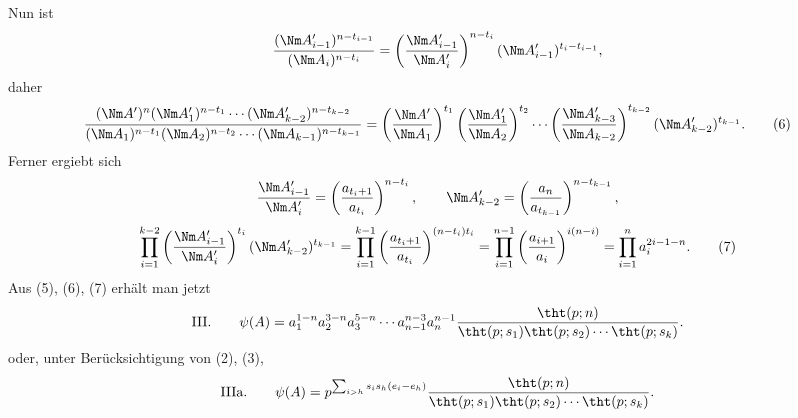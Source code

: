 Nun ist
\[
 { (\Nm A_{i-1}')^{n-t_{i-1}}
 \over (\Nm A_i)^{n-t_i} }
 =\left({\Nm A_{i-1}'\over\Nm A_i'}\right)^{n-t_i}(\Nm A_{i-1}')^{t_i-t_{i-1}},
\]
daher
\begin{equation}
 { (\Nm A')^n(\Nm A_1')^{n-t_1}\cdots(\Nm A_{k-2}')^{n-t_{k-2}}
 \over
 (\Nm A_1)^{n-t_1}(\Nm A_2)^{n-t_2}\cdots(\Nm A_{k-1})^{n-t_{k-1}} }
 =\left({\Nm A'\over\Nm A_1}\right)^{t_1}
 \left({\Nm A_1'\over\Nm A_2}\right)^{t_2}
 \cdots
 \left({\Nm A_{k-3}'\over\Nm A_{k-2}}\right)^{t_{k-2}}
 (\Nm A_{k-2}')^{t_{k-1}}.
\tag{6}
\end{equation}
Ferner ergiebt sich
\[
 {\Nm A_{i-1}'\over\Nm A_i'}=\left({a_{t_i+1}\over a_{t_i}}\right)^{n-t_i},
 \qquad
 \Nm A_{k-2}'=\left({a_n\over a_{t_{k-1}}}\right)^{n-t_{k-1}},
\]
\begin{equation}
 \prod_{i=1}^{k-2}\left({\Nm A_{i-1}'\over\Nm A_i'}\right)^{t_i}
 (\Nm A_{k-2}')^{t_{k-1}}
 =\prod_{i=1}^{k-1}\left({a_{t_i+1}\over a_{t_i}}\right)^{(n-t_i)t_i}
 =\prod_{i=1}^{n-1}\left({a_{i+1}\over a_i}\right)^{i(n-i)}
 =\prod_{i=1}^n a_i^{2i-1-n}.
\tag{7}
\end{equation}
Aus (5), (6), (7) erhält man jetzt
\[
\text{III.}\qquad
 \psi(A)=a_1^{1-n}a_2^{3-n}a_3^{5-n}\cdots a_{n-1}^{n-3}a_n^{n-1}
 {\tht(p;n)\over\tht(p;s_1)\tht(p;s_2)\cdots\tht(p;s_k)}.
\]
oder, unter Berücksichtigung von (2), (3),
\[
\text{IIIa.}\qquad
 \psi(A)=p^{\sum_{i>h}s_i s_h(e_i-e_h)}
 {\tht(p;n)\over\tht(p;s_1)\tht(p;s_2)\cdots\tht(p;s_k)}.
\]

